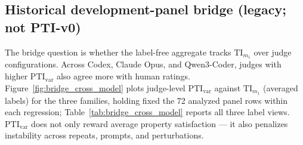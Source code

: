 \documentclass{article}
\newcommand{\TI}{\mathrm{TI}}                    %
\newcommand{\PTI}{\mathrm{PTI}}                  %
\newcommand{\TIm}[1]{\TI_{m_{#1}}}
\newcommand{\PTIvar}{\PTI_{\mathrm{var}}}        %
\begin{document}
\iffalse
\subsection{Historical development-panel bridge (legacy; not PTI-v0)}

The bridge question is whether the label-free aggregate tracks $\TIm{1}$ over judge configurations.
Across Codex, Claude Opus, and Qwen3-Coder, judges with higher $\PTIvar$ also agree more with human ratings.
Figure~\ref{fig:bridge_cross_model} plots judge-level $\PTIvar$ against $\TIm{1}$ (averaged labels) for the three families, holding fixed the 72 analyzed panel rows within each regression; Table~\ref{tab:bridge_cross_model} reports all three label views.
$\PTIvar$ does not only reward average property satisfaction --- it also penalizes instability across repeats, prompts, and perturbations.
\end{document}
